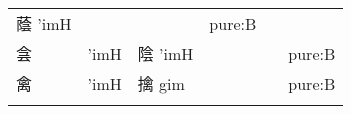 \documentclass[14pt,a4paper]{scrartcl}
\begin{document}
\begin{longtable}[c]{@{}llllll@{}}
\begin{minipage}[t]{0.14\columnwidth}
蔭 'imH
\strut\end{minipage} &
\begin{minipage}[t]{0.14\columnwidth}\raggedright\strut
\strut\end{minipage} &
\begin{minipage}[t]{0.14\columnwidth}\raggedright\strut
\strut\end{minipage} &
\begin{minipage}[t]{0.14\columnwidth}\raggedright\strut
pure:B
\strut\end{minipage}\tabularnewline
\begin{minipage}[t]{0.14\columnwidth}\raggedright\strut
侌
\strut\end{minipage} &
\begin{minipage}[t]{0.14\columnwidth}\raggedright\strut
'imH
\strut\end{minipage} &
\begin{minipage}[t]{0.14\columnwidth}\raggedright\strut
陰 'imH
\strut\end{minipage} &
\begin{minipage}[t]{0.14\columnwidth}\raggedright\strut
\strut\end{minipage} &
\begin{minipage}[t]{0.14\columnwidth}\raggedright\strut
\strut\end{minipage} &
\begin{minipage}[t]{0.14\columnwidth}\raggedright\strut
pure:B
\strut\end{minipage}\tabularnewline
\begin{minipage}[t]{0.14\columnwidth}\raggedright\strut
禽
\strut\end{minipage} &
\begin{minipage}[t]{0.14\columnwidth}\raggedright\strut
'imH
\strut\end{minipage} &
\begin{minipage}[t]{0.14\columnwidth}\raggedright\strut
擒 gim
\strut\end{minipage} &
\begin{minipage}[t]{0.14\columnwidth}\raggedright\strut
\strut\end{minipage} &
\begin{minipage}[t]{0.14\columnwidth}\raggedright\strut
\strut\end{minipage} &
\begin{minipage}[t]{0.14\columnwidth}\raggedright\strut
pure:B
\strut\end{minipage}\tabularnewline
\begin{minipage}[t]{0.14\columnwidth}\raggedright\strut

\end{minipage}
\end{longtable}
\end{document}
